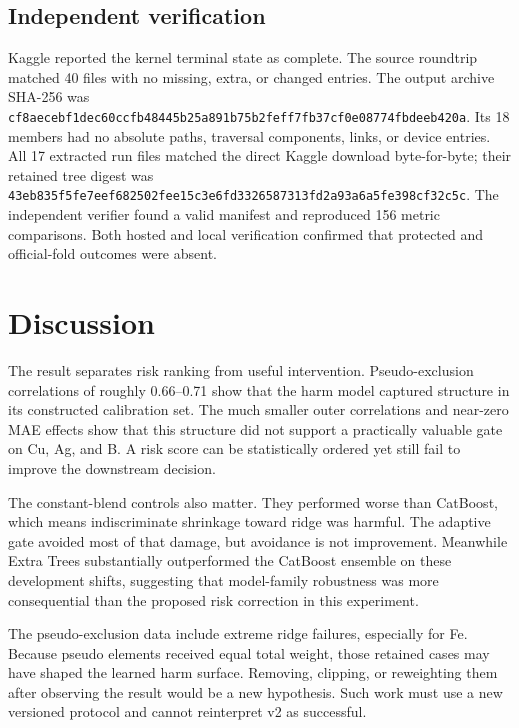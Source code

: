 \documentclass[11pt]{article}
\begin{document}
\subsection{Independent verification}
Kaggle reported the kernel terminal state as complete. The source roundtrip
matched 40 files with no missing, extra, or changed entries. The output archive
SHA-256 was
\texttt{cf8aeceb\allowbreak{}f1dec60c\allowbreak{}cfb48445\allowbreak{}b25a891b\allowbreak{}75b2feff\allowbreak{}7fb37cf0\allowbreak{}e08774fb\allowbreak{}deeb420a}.
Its 18 members had no absolute paths, traversal components, links, or device
entries. All 17 extracted run files matched the direct Kaggle download
byte-for-byte; their retained tree digest was
\texttt{43eb835f\allowbreak{}5fe7eef6\allowbreak{}82502fee\allowbreak{}15c3e6fd\allowbreak{}33265873\allowbreak{}13fd2a93\allowbreak{}a6a5fe39\allowbreak{}8cf32c5c}.
The independent verifier found a valid manifest and reproduced 156 metric
comparisons. Both hosted and local verification confirmed that protected and
official-fold outcomes were absent.

\section{Discussion}
The result separates risk ranking from useful intervention. Pseudo-exclusion
correlations of roughly 0.66--0.71 show that the harm model captured structure
in its constructed calibration set. The much smaller outer correlations and
near-zero MAE effects show that this structure did not support a practically
valuable gate on Cu, Ag, and B. A risk score can be statistically ordered yet
still fail to improve the downstream decision.

The constant-blend controls also matter. They performed worse than CatBoost,
which means indiscriminate shrinkage toward ridge was harmful. The adaptive gate
avoided most of that damage, but avoidance is not improvement. Meanwhile Extra
Trees substantially outperformed the CatBoost ensemble on these development
shifts, suggesting that model-family robustness was more consequential than the
proposed risk correction in this experiment.

The pseudo-exclusion data include extreme ridge failures, especially for Fe.
Because pseudo elements received equal total weight, those retained cases may
have shaped the learned harm surface. Removing, clipping, or reweighting them
after observing the result would be a new hypothesis. Such work must use a new
versioned protocol and cannot reinterpret v2 as successful.
\end{document}
